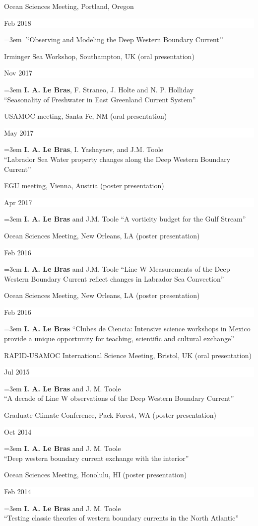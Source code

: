 \documentclass[paper=letter,fontsize=11pt]{scrartcl} %
\newcommand{\sepspace}{\vspace*{3mm}}		%
\newcommand{\TalkEntry}[3]{
		\noindent #1 \hfill      %
		\colorbox{White}{%
			\parbox{6em}{%
			\hfill\color{Black}#2}} \par  %
		\noindent\hangindent=3em\hangafter=0 \textit ``#3''\sepspace} %
\newcommand{\ConfEntry}[5]{
		\noindent #1 (#2) \hfill      %
		\colorbox{White}{%
			\parbox{6em}{%
			\hfill\color{Black}#3}} \par %
		\noindent \hangindent=3em\hangafter=0 #4 ``#5'' \sepspace}
\begin{document}
\TalkEntry{Ocean Sciences Meeting, Portland, Oregon}{Feb 2018}{Observing and Modeling the Deep Western Boundary Current}

\ConfEntry{Irminger Sea Workshop, Southampton, UK}{oral presentation}{Nov 2017}{\textbf{I. A. Le Bras}, F. Straneo, J. Holte and N. P. Holliday\\}{Seasonality of Freshwater in East Greenland Current System}

\ConfEntry{USAMOC meeting, Santa Fe, NM}{oral presentation}{May 2017}{\textbf{I. A. Le Bras}, I. Yashayaev, and J.M. Toole\\}{Labrador Sea Water property changes along the Deep Western Boundary Current}

\ConfEntry{EGU meeting, Vienna, Austria}{poster presentation}{Apr 2017}{\textbf{I. A. Le Bras} and J.M. Toole}{A vorticity budget for the Gulf Stream}

\ConfEntry{Ocean Sciences Meeting, New Orleans, LA}{poster presentation}{Feb 2016}{\textbf{I. A. Le Bras} and J.M. Toole}{Line W Measurements of the Deep Western Boundary Current reflect changes in Labrador Sea Convection}

\ConfEntry{Ocean Sciences Meeting, New Orleans, LA}{poster presentation}{Feb 2016}{\textbf{I. A. Le Bras}}{Clubes de Ciencia: Intensive science workshops in Mexico provide a unique opportunity for teaching, scientific and cultural exchange}

\ConfEntry{RAPID-USAMOC International Science Meeting, Bristol, UK}{oral presentation}{Jul 2015}{\textbf{I. A. Le Bras} and J. M. Toole\\}{A decade of Line W observations of the Deep Western Boundary Current}

\ConfEntry{Graduate Climate Conference, Pack Forest, WA}{poster presentation}{Oct 2014}{\textbf{I. A. Le Bras} and J. M. Toole\\}{Deep western boundary current exchange with the interior}

\ConfEntry{Ocean Sciences Meeting, Honolulu, HI}{poster presentation}{Feb 2014}{\textbf{I. A. Le Bras} and J. M. Toole\\}{Testing classic theories of western boundary currents in the North Atlantic}

\end{document}
